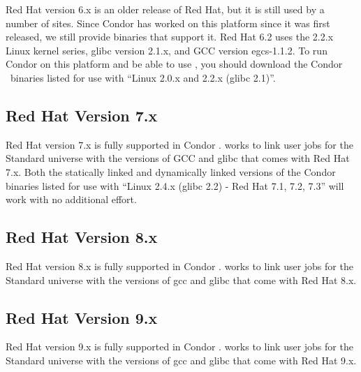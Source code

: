 Red Hat version 6.x is an older release of Red Hat, but it is still used
by a number of sites.
Since Condor has worked on this platform since it was first released,
we still provide binaries that support it.
Red Hat 6.2 uses the 2.2.x Linux kernel series, glibc version 2.1.x,
and GCC version egcs-1.1.2.
To run Condor on this platform and be able to use ,
you should download the Condor \VersionNotice\  binaries listed for use
with ``Linux 2.0.x and 2.2.x (glibc 2.1)''.


\subsection{\label{sec:platform-linux-rh7}Red Hat Version 7.x}

Red Hat version 7.x is fully supported in Condor \VersionNotice.
 works to link user jobs for the Standard universe
with the versions of GCC and glibc that comes with Red Hat 7.x.
Both the statically linked and dynamically linked versions of the
Condor binaries listed for use with ``Linux 2.4.x (glibc 2.2) - Red Hat
7.1, 7.2, 7.3'' will work with no additional effort.


\subsection{\label{sec:platform-linux-rh8}Red Hat Version 8.x}

Red Hat version 8.x is fully supported in Condor \VersionNotice.
 works to link user jobs for the Standard universe
with the versions of gcc and glibc that come with Red Hat 8.x.

\subsection{\label{sec:platform-linux-rh9}Red Hat Version 9.x}

Red Hat version 9.x is fully supported in Condor \VersionNotice.
 works to link user jobs for the Standard universe
with the versions of gcc and glibc that come with Red Hat 9.x.
